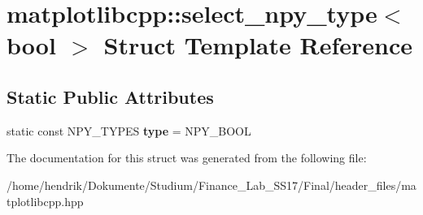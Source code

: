 \hypertarget{structmatplotlibcpp_1_1select__npy__type_3_01bool_01_4}{}\section{matplotlibcpp\+:\+:select\+\_\+npy\+\_\+type$<$ bool $>$ Struct Template Reference}
\label{structmatplotlibcpp_1_1select__npy__type_3_01bool_01_4}
\subsection*{Static Public Attributes}
\begin{DoxyCompactItemize}
\item 
static const N\+P\+Y\+\_\+\+T\+Y\+P\+ES {\bfseries type} = N\+P\+Y\+\_\+\+B\+O\+OL\hypertarget{structmatplotlibcpp_1_1select__npy__type_3_01bool_01_4_a79dc3db61a3b0f4796a29d067d5dd374}{}\label{structmatplotlibcpp_1_1select__npy__type_3_01bool_01_4_a79dc3db61a3b0f4796a29d067d5dd374}

\end{DoxyCompactItemize}


The documentation for this struct was generated from the following file\+:\begin{DoxyCompactItemize}
\item 
/home/hendrik/\+Dokumente/\+Studium/\+Finance\+\_\+\+Lab\+\_\+\+S\+S17/\+Final/header\+\_\+files/matplotlibcpp.\+hpp\end{DoxyCompactItemize}
